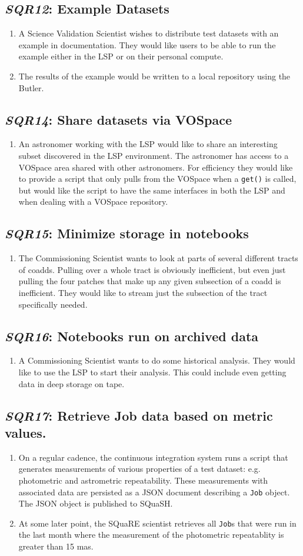 \documentclass[DM,toc,lsstdraft]{lsstdoc}
\newcommand{\usecase}[3]{%
\subsection{\emph{#1}: #2}
\label{use:#1}
\begin{enumerate}[label=\alph*.]
#3
\end{enumerate}
}
\begin{document}
\usecase{SQR12}{Example Datasets}{%

\item
A Science Validation Scientist wishes to distribute test datasets with an example in documentation.
They would like users to be able to run the example either in the LSP or on their personal compute.

\item
The results of the example would be written to a local repository using the Butler.

}

\usecase{SQR14}{Share datasets via VOSpace}{%

\item
An astronomer working with the LSP would like to share an interesting subset discovered in the LSP environment.
The astronomer has access to a VOSpace area shared with other astronomers.
For efficiency they would like to provide a script that only pulls from the VOSpace when a \texttt{get()} is called, but would like the script to have the same interfaces in both the LSP and when dealing with a VOSpace repository.

}

\usecase{SQR15}{Minimize storage in notebooks}{%

\item
The Commissioning Scientist wants to look at parts of several different tracts of coadds.
Pulling over a whole tract is obviously inefficient, but even just pulling the four patches that make up any given subsection of a coadd is inefficient.
They would like to stream just the subsection of the tract specifically needed.

}

\usecase{SQR16}{Notebooks run on archived data}{%

\item
A Commissioning Scientist wants to do some historical analysis.
They would like to use the LSP to start their analysis.
This could include even getting data in deep storage on tape.

}

\usecase{SQR17}{Retrieve Job data based on metric values.}{%

\item
On a regular cadence, the continuous integration system runs a script that generates measurements of various properties of a test dataset: e.g. photometric and astrometric repeatability.
These measurements with associated data are persisted as a JSON document describing a \texttt{Job} object.
The JSON object is published to SQuaSH.

\item
At some later point, the SQuaRE scientist retrieves all \texttt{Job}s that were run in the last month where the measurement of the photometric repeatablity is greater than 15 mas.

}
\end{document}
